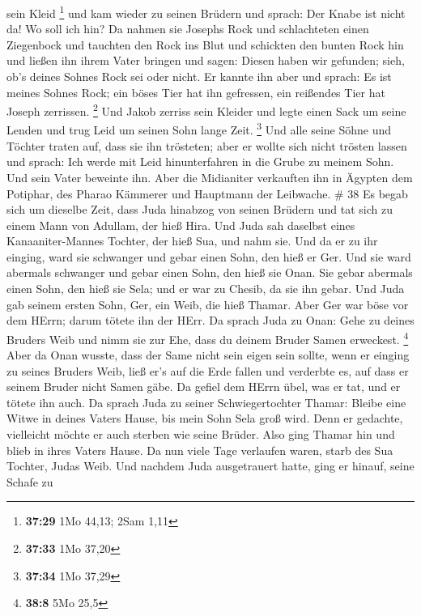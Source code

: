 sein Kleid \footnote{\textbf{37:29} 1Mo 44,13; 2Sam 1,11} 
und kam wieder zu seinen Brüdern und sprach: Der Knabe ist nicht da! Wo
soll ich hin?  Da nahmen sie Josephs Rock und schlachteten
einen Ziegenbock und tauchten den Rock ins Blut  und
schickten den bunten Rock hin und ließen ihn ihrem Vater bringen und
sagen: Diesen haben wir gefunden; sieh, ob's deines Sohnes Rock sei oder
nicht.  Er kannte ihn aber und sprach: Es ist meines Sohnes
Rock; ein böses Tier hat ihn gefressen, ein reißendes Tier hat Joseph
zerrissen. \footnote{\textbf{37:33} 1Mo 37,20}  Und Jakob
zerriss sein Kleider und legte einen Sack um seine Lenden und trug Leid
um seinen Sohn lange Zeit. \footnote{\textbf{37:34} 1Mo 37,29}
 Und alle seine Söhne und Töchter traten auf, dass sie ihn
trösteten; aber er wollte sich nicht trösten lassen und sprach: Ich
werde mit Leid hinunterfahren in die Grube zu meinem Sohn. Und sein
Vater beweinte ihn.  Aber die Midianiter verkauften ihn in
Ägypten dem Potiphar, des Pharao Kämmerer und Hauptmann der Leibwache.
\# 38  Es begab sich um dieselbe Zeit, dass Juda hinabzog
von seinen Brüdern und tat sich zu einem Mann von Adullam, der hieß
Hira.  Und Juda sah daselbst eines Kanaaniter-Mannes
Tochter, der hieß Sua, und nahm sie. Und da er zu ihr einging,
 ward sie schwanger und gebar einen Sohn, den hieß er Ger.
 Und sie ward abermals schwanger und gebar einen Sohn, den
hieß sie Onan.  Sie gebar abermals einen Sohn, den hieß sie
Sela; und er war zu Chesib, da sie ihn gebar.  Und Juda gab
seinem ersten Sohn, Ger, ein Weib, die hieß Thamar.  Aber
Ger war böse vor dem HErrn; darum tötete ihn der HErr.  Da
sprach Juda zu Onan: Gehe zu deines Bruders Weib und nimm sie zur Ehe,
dass du deinem Bruder Samen erweckest. \footnote{\textbf{38:8} 5Mo 25,5}
 Aber da Onan wusste, dass der Same nicht sein eigen sein
sollte, wenn er einging zu seines Bruders Weib, ließ er's auf die Erde
fallen und verderbte es, auf dass er seinem Bruder nicht Samen gäbe.
 Da gefiel dem HErrn übel, was er tat, und er tötete ihn
auch.  Da sprach Juda zu seiner Schwiegertochter Thamar:
Bleibe eine Witwe in deines Vaters Hause, bis mein Sohn Sela groß wird.
Denn er gedachte, vielleicht möchte er auch sterben wie seine Brüder.
Also ging Thamar hin und blieb in ihres Vaters Hause.  Da
nun viele Tage verlaufen waren, starb des Sua Tochter, Judas Weib. Und
nachdem Juda ausgetrauert hatte, ging er hinauf, seine Schafe zu
